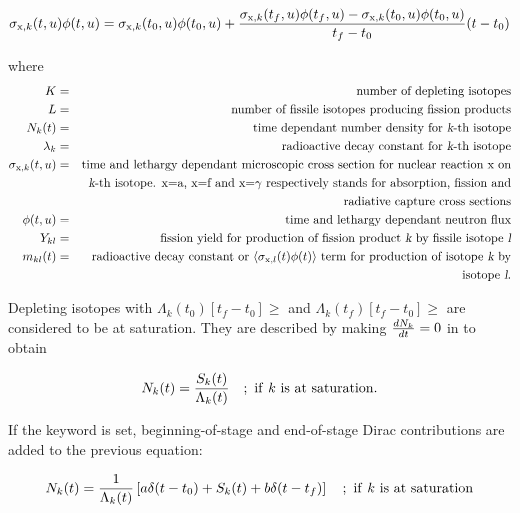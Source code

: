 \begin{equation}
\sigma_{{\rm x},k}(t,u)\phi(t,u)= \sigma_{{\rm x},k}(t_0,u)\phi(t_0,u)+
{\sigma_{{\rm x},k}(t_f,u)\phi(t_f,u)-\sigma_{{\rm x},k}(t_0,u)\phi(t_0,u) \over t_f-t_0}(t-t_0)
\end{equation}

\noindent where
\begin{eqnarray}
\nonumber K &=& \hbox{number of depleting isotopes} 
\\
\nonumber L &=& \hbox{number of fissile isotopes producing fission products} 
\\
\nonumber N_k(t) &=& \hbox{time dependant number density for {\sl k}-th isotope} 
\\
\nonumber \lambda_k &=& \hbox{radioactive decay constant for {\sl k}-th isotope} 
\\
\nonumber \sigma_{{\rm x},k}(t,u) &=& \hbox{time and lethargy dependant microscopic cross section for
nuclear reaction x on} 
\\
\nonumber &~& \hbox{{\sl k}-th isotope. x=a, x=f and x=$\gamma$ respectively stands for absorption, fission and} 
\\
\nonumber &~& \hbox{radiative capture cross sections} 
\\
\nonumber \phi(t,u) &=& \hbox{time and lethargy dependant neutron flux} 
\\
\nonumber Y_{kl} &=& \hbox{fission yield for production of fission product {\sl k} by fissile
isotope {\sl l}} 
\\
\nonumber m_{kl}(t) &=& \hbox{radioactive decay constant or $\langle \sigma_{{\rm x},l}(t)
\phi(t) \rangle$ term for production of isotope {\sl k} by}
\\
\nonumber &~& \hbox{isotope {\sl l}.} 
\end{eqnarray}

Depleting isotopes with $\Lambda_k(t_0)\left[t_f-t_0\right]\geq$ and
$\Lambda_k(t_f)\left[t_f-t_0\right]\geq$ are considered to be at saturation. They are
described by making ${dN_k \over dt}=0$ in  to obtain

\begin{equation}
N_k(t)={S_k(t)\over\Lambda_k(t)} \ \ \ ; \ {{\rm if} \ k \ {\rm is \ at \ saturation.}}
\label{eq:sat1}
\end{equation}

If the keyword  is set, beginning-of-stage and end-of-stage Dirac contributions are
added to the previous equation:

\begin{equation}
N_k(t)={1\over\Lambda_k(t)}\left[a \delta(t-t_0) +S_k(t)+b \delta(t-t_f)\right] \ \ \ ; \ {{\rm
if} \ k \ {\rm is \ at \ saturation}}
\label{eq:sat2}
\end{equation}
 
